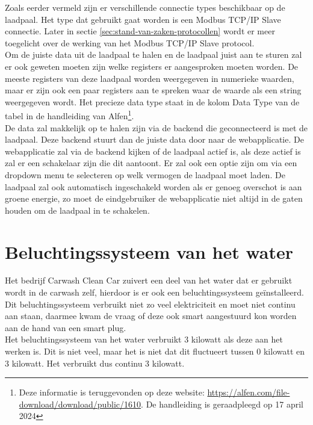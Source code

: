 Zoals eerder vermeld zijn er verschillende connectie types beschikbaar op de laadpaal. Het type dat gebruikt gaat worden is een Modbus TCP/IP Slave connectie. Later in sectie \ref{sec:stand-van-zaken-protocollen} wordt er meer toegelicht over de werking van het Modbus TCP/IP Slave protocol.\\

Om de juiste data uit de laadpaal te halen en de laadpaal juist aan te sturen zal er ook geweten moeten zijn welke registers er aangesproken moeten worden. De meeste registers van deze laadpaal worden weergegeven in numerieke waarden, maar er zijn ook een paar registers aan te spreken waar de waarde als een string weergegeven wordt. Het precieze data type staat in de kolom Data Type van de tabel in de handleiding van Alfen\footnote{Deze informatie is teruggevonden op deze website: \url{https://alfen.com/file-download/download/public/1610}. De handleiding is geraadpleegd op 17 april 2024}.\\

De data zal makkelijk op te halen zijn via de backend die geconnecteerd is met de laadpaal. Deze backend stuurt dan de juiste data door naar de webapplicatie. De webapplicatie zal via de backend kijken of de laadpaal actief is, als deze actief is zal er een schakelaar zijn die dit aantoont. Er zal ook een optie zijn om via een dropdown menu te selecteren op welk vermogen de laadpaal moet laden. De laadpaal zal ook automatisch ingeschakeld worden als er genoeg overschot is aan groene energie, zo moet de eindgebruiker de webapplicatie niet altijd in de gaten houden om de laadpaal in te schakelen.

\section{Beluchtingssysteem van het water}
\label{sec:stand-van-zaken-beluchtingssysteem}

Het bedrijf Carwash Clean Car zuivert een deel van het water dat er gebruikt wordt in de carwash zelf, hierdoor is er ook een beluchtingssysteem geïnstalleerd. Dit beluchtingssysteem verbruikt niet zo veel elektriciteit en moet niet continu aan staan, daarmee kwam de vraag of deze ook smart aangestuurd kon worden aan de hand van een smart plug.\\

Het beluchtingssysteem van het water verbruikt 3 kilowatt als deze aan het werken is. Dit is niet veel, maar het is niet dat dit fluctueert tussen 0 kilowatt en 3 kilowatt. Het verbruikt dus continu 3 kilowatt.\\

